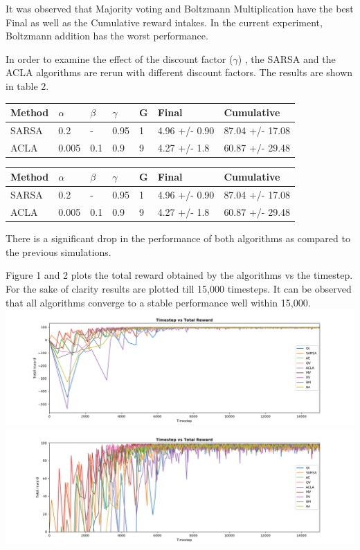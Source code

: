  It was observed that Majority voting and Boltzmann Multiplication have
the best Final as well as the Cumulative reward intakes. In the current
experiment, Boltzmann addition has the worst performance.

In order to examine the effect of the discount factor (\(\gamma\)) , the
SARSA and the ACLA algorithms are rerun with different discount factors.
The results are shown in table 2.

\begin{longtable}[]{@{}lllllll@{}}
\toprule
Method & \(\alpha\) & \(\beta\) & \(\gamma\) & G & Final &
Cumulative\tabularnewline
\midrule
\endhead
SARSA & 0.2 & - & 0.95 & 1 & 4.96 +/- 0.90 & 87.04 +/-
17.08\tabularnewline
ACLA & 0.005 & 0.1 & 0.9 & 9 & 4.27 +/- 1.8 & 60.87 +/-
29.48\tabularnewline
\bottomrule
\end{longtable}

\begin{table}[]
\begin{tabular}{|l|l|l|l|l|l|l|}
\hline
Method & $\alpha$ & $\beta$ & $\gamma$ & G & Final         & Cumulative      \\ \hline
SARSA  & 0.2      & -       & 0.95     & 1 & 4.96 +/- 0.90 & 87.04 +/- 17.08 \\ \hline
ACLA   & 0.005    & 0.1     & 0.9      & 9 & 4.27 +/- 1.8  & 60.87 +/- 29.48 \\ \hline
\end{tabular}
\end{table}

 There is a significant drop in the performance of both algorithms as
compared to the previous simulations.

Figure 1 and 2 plots the total reward obtained by the algorithms vs the
timestep. For the sake of clarity results are plotted till 15,000
timesteps. It can be observed that all algorithms converge to a stable
performance well within 15,000.
\includegraphics{img/Timestep_vs_Total_reward_simple.png}
\includegraphics{img/Timestep_vs_Total_reward_zoomed_simple.png}

